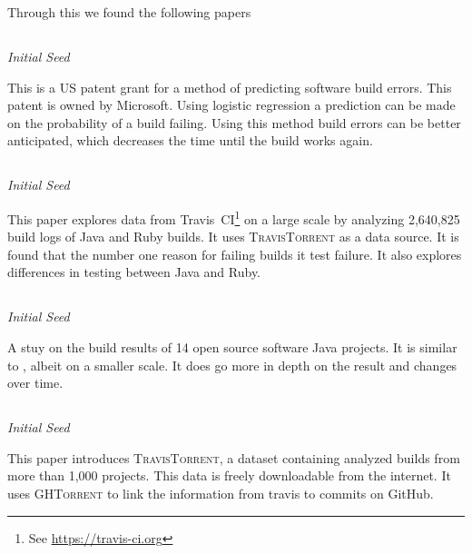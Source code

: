 \documentclass[]{book}
\let\rmarkdownfootnote\footnote%
\def\footnote{\protect\rmarkdownfootnote}
\begin{document}
Through this we found the following papers

\subsection{\texorpdfstring{\citet{bird2017predicting}}{@bird2017predicting}}\label{bird2017predicting}

\emph{Initial Seed}

This is a US patent grant for a method of predicting software build
errors. This patent is owned by Microsoft. Using logistic regression a
prediction can be made on the probability of a build failing. Using this
method build errors can be better anticipated, which decreases the time
until the build works again.

\subsection{\texorpdfstring{\citet{beller2017oops}}{@beller2017oops}}\label{beller2017oops}

\emph{Initial Seed}

This paper explores data from Travis~CI\footnote{See
  \url{https://travis-ci.org}} on a large scale by analyzing 2,640,825
build logs of Java and Ruby builds. It uses \textsc{TravisTorrent} as a
data source. It is found that the number one reason for failing builds
it test failure. It also explores differences in testing between Java
and Ruby.

\subsection{\texorpdfstring{\citet{rausch2017empirical}}{@rausch2017empirical}}\label{rausch2017empirical}

\emph{Initial Seed}

A stuy on the build results of 14 open source software Java projects. It
is similar to \citet{beller2017oops}, albeit on a smaller scale. It does
go more in depth on the result and changes over time.

\subsection{\texorpdfstring{\citet{beller2017travistorrent}}{@beller2017travistorrent}}\label{beller2017travistorrent}

\emph{Initial Seed}

This paper introduces \textsc{TravisTorrent}, a dataset containing
analyzed builds from more than 1,000 projects. This data is freely
downloadable from the internet. It uses \textsc{GHTorrent} to link the
information from travis to commits on GitHub.
\end{document}
